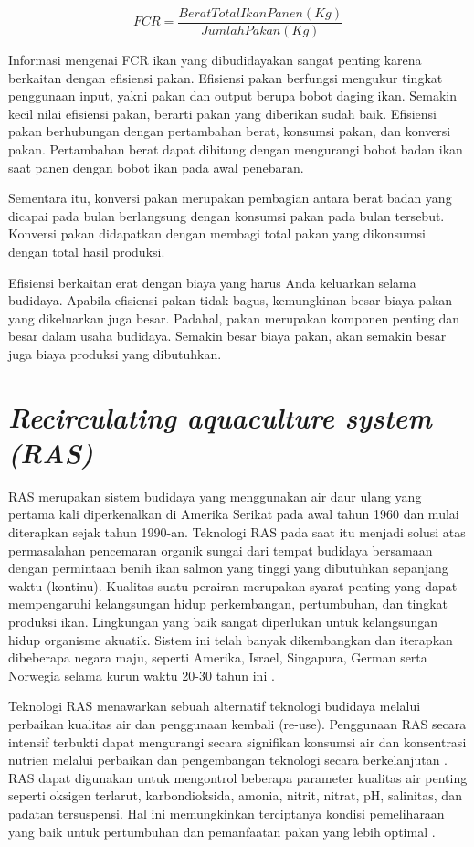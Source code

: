 \begin{equation*}
	FCR=\frac{Berat Total Ikan Panen(Kg)}{Jumlah Pakan(Kg)}
\end{equation*}

Informasi mengenai FCR ikan yang dibudidayakan sangat penting karena berkaitan dengan efisiensi pakan. Efisiensi pakan berfungsi mengukur tingkat penggunaan input, yakni pakan dan output berupa bobot daging ikan. Semakin kecil nilai efisiensi pakan, berarti pakan yang diberikan sudah baik. Efisiensi pakan berhubungan dengan pertambahan berat, konsumsi pakan, dan konversi pakan. Pertambahan berat dapat dihitung dengan mengurangi bobot badan ikan saat panen dengan bobot ikan pada awal penebaran.

Sementara itu, konversi pakan merupakan pembagian antara berat badan yang dicapai pada bulan berlangsung dengan konsumsi pakan pada bulan tersebut. Konversi pakan didapatkan dengan membagi total pakan yang dikonsumsi dengan total hasil produksi.

Efisiensi berkaitan erat dengan biaya yang harus Anda keluarkan selama budidaya. Apabila efisiensi pakan tidak bagus, kemungkinan besar biaya pakan yang dikeluarkan juga besar. Padahal, pakan merupakan komponen penting dan besar dalam usaha budidaya. Semakin besar biaya pakan, akan semakin besar juga biaya produksi yang dibutuhkan.

\section{\emph{Recirculating aquaculture system (RAS)}}

RAS merupakan sistem budidaya yang menggunakan air daur ulang yang pertama kali diperkenalkan di Amerika Serikat pada awal tahun 1960 dan mulai diterapkan sejak tahun 1990-an. Teknologi RAS pada saat itu menjadi solusi atas permasalahan pencemaran organik sungai dari tempat budidaya bersamaan dengan permintaan benih ikan salmon yang tinggi yang dibutuhkan sepanjang waktu (kontinu). Kualitas suatu perairan merupakan syarat penting yang dapat mempengaruhi kelangsungan hidup perkembangan, pertumbuhan, dan tingkat produksi ikan. Lingkungan yang baik sangat diperlukan untuk kelangsungan hidup organisme akuatik. Sistem ini telah banyak dikembangkan dan iterapkan dibeberapa negara maju, seperti Amerika, Israel, Singapura, German serta Norwegia selama kurun waktu 20-30 tahun ini \citep{fadhil2010}.

Teknologi RAS menawarkan sebuah alternatif teknologi budidaya melalui perbaikan kualitas air dan penggunaan kembali (re-use). Penggunaan RAS secara intensif terbukti dapat mengurangi secara signifikan konsumsi air dan konsentrasi nutrien melalui perbaikan dan pengembangan teknologi secara berkelanjutan \citep{thesiana2015}. RAS dapat digunakan untuk mengontrol beberapa parameter kualitas air penting seperti oksigen terlarut, karbondioksida, amonia, nitrit, nitrat, pH, salinitas, dan padatan tersuspensi. Hal ini memungkinkan terciptanya kondisi pemeliharaan yang baik untuk pertumbuhan dan pemanfaatan pakan yang lebih optimal \citep{dalsgaard2013}.

